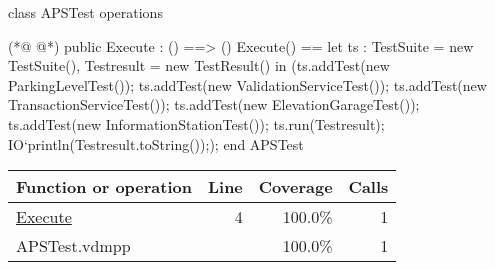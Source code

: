 \begin{vdmpp}[breaklines=true]
class APSTest
operations 

(*@
\label{Execute:4}
@*)
public Execute : () ==> ()
Execute() ==
 let ts : TestSuite = new TestSuite(),
 Testresult = new TestResult()
 in
  (ts.addTest(new ParkingLevelTest());
  ts.addTest(new ValidationServiceTest());
  ts.addTest(new TransactionServiceTest());
  ts.addTest(new ElevationGarageTest());
  ts.addTest(new InformationStationTest());
  ts.run(Testresult);
  IO`println(Testresult.toString()););
end APSTest
\end{vdmpp}
\bigskip
\begin{longtable}{|l|r|r|r|}
\hline
Function or operation & Line & Coverage & Calls \\
\hline
\hline
\hyperref[Execute:4]{Execute} & 4&100.0\% & 1 \\
\hline
\hline
APSTest.vdmpp & & 100.0\% & 1 \\
\hline
\end{longtable}

